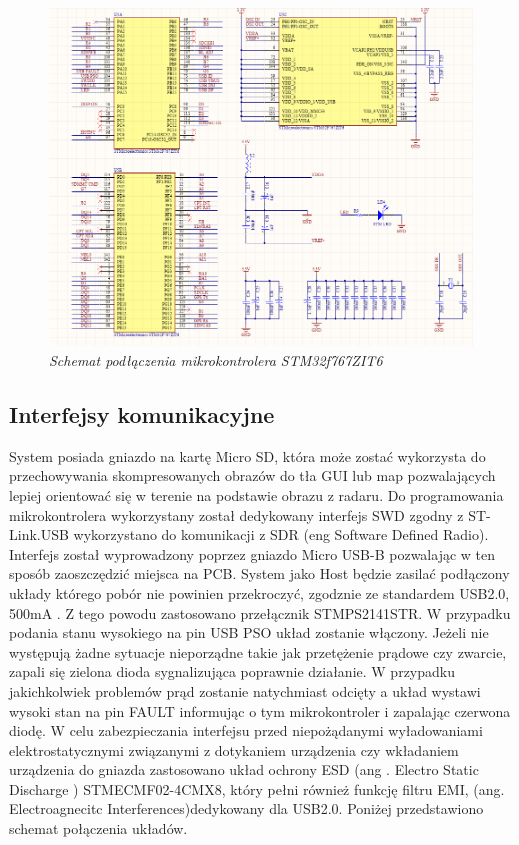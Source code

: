 \documentclass[eng,printmode]{mgr}
\begin{document}
\begin{figure}[!h]
    \centering
    \includegraphics[height=\textwidth, angle=90]{schematics/uC.png}
    \caption{\textit{\scriptsize Schemat podłączenia mikrokontrolera STM32f767ZIT6}}
\end{figure}

\subsection*{Interfejsy komunikacyjne}
System posiada gniazdo na kartę Micro SD, która może zostać wykorzysta do przechowywania skompresowanych obrazów do tła GUI lub map pozwalających lepiej orientować się w terenie na podstawie obrazu z radaru. Do programowania mikrokontrolera wykorzystany został dedykowany interfejs SWD zgodny z ST-Link.USB wykorzystano do komunikacji z SDR (eng Software Defined Radio). Interfejs został wyprowadzony poprzez gniazdo Micro USB-B pozwalając w ten sposób zaoszczędzić miejsca na PCB. System jako Host będzie zasilać podłączony układy którego pobór nie powinien przekroczyć, zgodznie ze standardem USB2.0, 500mA . Z tego powodu zastosowano przełącznik STMPS2141STR. W przypadku podania stanu wysokiego na pin USB PSO układ zostanie włączony. Jeżeli nie występują żadne sytuacje nieporządne takie jak przetężenie prądowe czy zwarcie, zapali się zielona dioda sygnalizująca poprawnie działanie. W przypadku jakichkolwiek problemów prąd zostanie natychmiast odcięty a układ wystawi wysoki stan na pin FAULT informując o tym mikrokontroler i zapalając czerwona diodę. W celu zabezpieczania interfejsu przed niepożądanymi wyładowaniami elektrostatycznymi związanymi z dotykaniem urządzenia czy wkładaniem urządzenia do gniazda zastosowano układ ochrony ESD (ang . Electro Static Discharge ) STMECMF02-4CMX8, który pełni również funkcję filtru EMI, (ang. Electroagnecitc Interferences)dedykowany dla USB2.0. Poniżej przedstawiono schemat połączenia układów.
\end{document}
